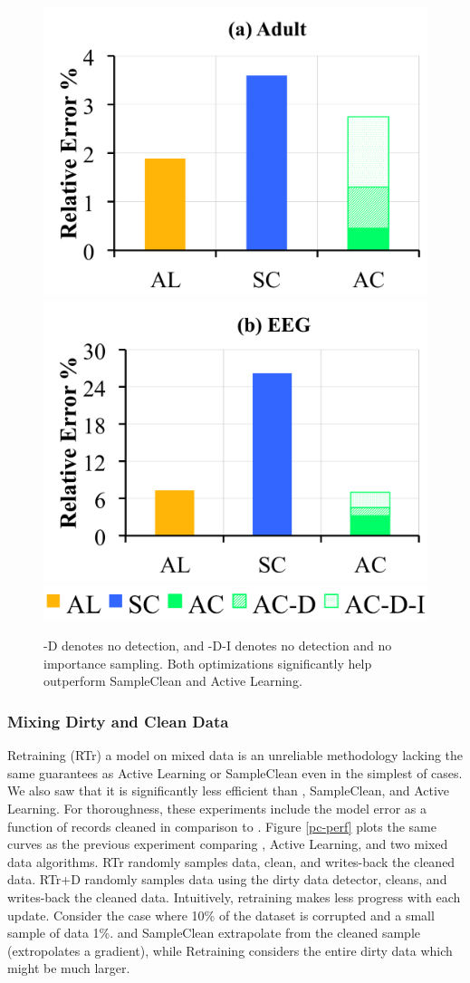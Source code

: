 \begin{figure}[t]\vspace{0.5em}
\centering
 \includegraphics[width=0.49\columnwidth]{exp/exp8a.png}
 \includegraphics[width=0.49\columnwidth]{exp/exp8b.png}
 \includegraphics[width=0.5\columnwidth]{exp/legend-8.png}\vspace{-1em}
 \caption{ -D denotes no detection, and -D-I denotes no detection and no importance sampling. Both optimizations significantly help \sys outperform SampleClean and Active Learning. \label{opts}}\vspace{-1.5em}
\end{figure}

\subsubsection{Mixing Dirty and Clean Data}\label{exp:rtr}
Retraining (RTr) a model on mixed data is an unreliable methodology lacking the same guarantees as Active Learning or SampleClean even in the simplest of cases.
We also saw that it is significantly less efficient than \sys, SampleClean, and Active Learning.
For thoroughness, these experiments include the model error as a function of records cleaned in comparison to \sys.
Figure \ref{pc-perf} plots the same curves as the previous experiment comparing \sys, Active Learning, and two mixed data algorithms.
RTr randomly samples data, clean, and writes-back the cleaned data.
RTr+D randomly samples data using the dirty data detector, cleans, and writes-back the cleaned data.
Intuitively, retraining makes less progress with each update.
Consider the case where 10\% of the dataset is corrupted and a small sample of data 1\%.
\sys and SampleClean extrapolate from the cleaned sample (\sys extropolates a gradient), while Retraining considers the entire dirty data which might be much larger.

